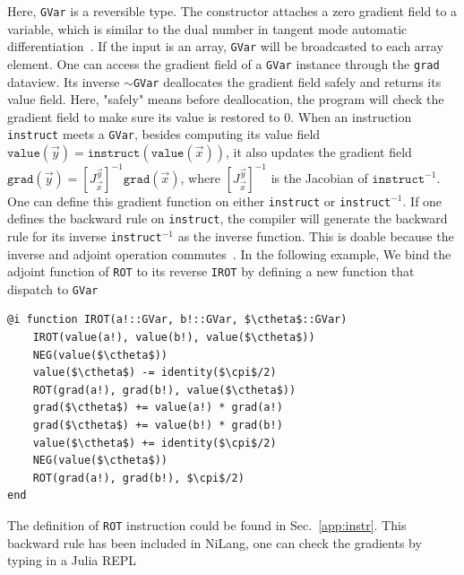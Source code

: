 \documentclass[aps,twocolumn,longbibliography,english,superscriptaddress]{revtex4-1}
\newcommand{\<}{\langle}
\renewcommand{\>}{\rangle}
\newcommand{\vx}{{\vec x}}
\newcommand{\vy}{{\vec y}}
\newcommand{\vvalue}{{\texttt{value}}}
\newcommand{\grad}{{\texttt{grad}}}
\newcommand{\ctheta}{{\color{jlbase}{\rm \theta}}}
\newcommand{\cpi}{{\color{jlbase}{\rm \pi}}}
\newcommand{\Sec}[1]{Sec.~\ref{#1}}
\theoremstyle{definition}\newtheorem{definition}{\textit{Definition}}
\begin{document}
Here, \texttt{GVar} is a reversible type. The constructor attaches a zero gradient field to a variable, which is similar to the dual number in tangent mode automatic differentiation~\cite{Revels2016}. If the input is an array, \texttt{GVar} will be broadcasted to each array element. One can access the gradient field of a \texttt{GVar} instance through the \texttt{grad} dataview. Its inverse \texttt{$\sim$GVar} deallocates the gradient field safely and returns its value field. Here, "safely" means before deallocation, the program will check the gradient field to make sure its value is restored to $0$.
When an instruction \texttt{instruct} meets a \texttt{GVar}, besides computing its value field $\vvalue(\vy) = \texttt{instruct}(\vvalue(\vx))$, it also updates the gradient field $\grad(\vy) = \left[J^{\vy}_{\vx}\right]^{-1} \grad(\vx)$, where $\left[J^{\vy}_{\vx}\right]^{-1}$ is the Jacobian of $\texttt{instruct}^{-1}$. One can define this gradient function on either \texttt{instruct} or \texttt{instruct${}^{-1}$}. If one defines the backward rule on \texttt{instruct}, the compiler will generate the backward rule for its inverse \texttt{instruct${}^{-1}$} as the inverse function. This is doable because the inverse and adjoint operation commutes~\cite{Mcinerney2015}. In the following example, We bind the adjoint function of \texttt{ROT} to its reverse \texttt{IROT} by defining a new function that dispatch to \texttt{GVar}

\begin{minipage}{.44\textwidth}
    \begin{lstlisting}[mathescape=true]
@i function IROT(a!::GVar, b!::GVar, $\ctheta$::GVar)
    IROT(value(a!), value(b!), value($\ctheta$))
    NEG(value($\ctheta$))
    value($\ctheta$) -= identity($\cpi$/2)
    ROT(grad(a!), grad(b!), value($\ctheta$))
    grad($\ctheta$) += value(a!) * grad(a!)
    grad($\ctheta$) += value(b!) * grad(b!)
    value($\ctheta$) += identity($\cpi$/2)
    NEG(value($\ctheta$))
    ROT(grad(a!), grad(b!), $\cpi$/2)
end
\end{lstlisting}
\end{minipage}

The definition of \texttt{ROT} instruction could be found in \Sec{app:instr}. This backward rule has been included in NiLang, one can check the gradients by typing in a Julia REPL
\end{document}
